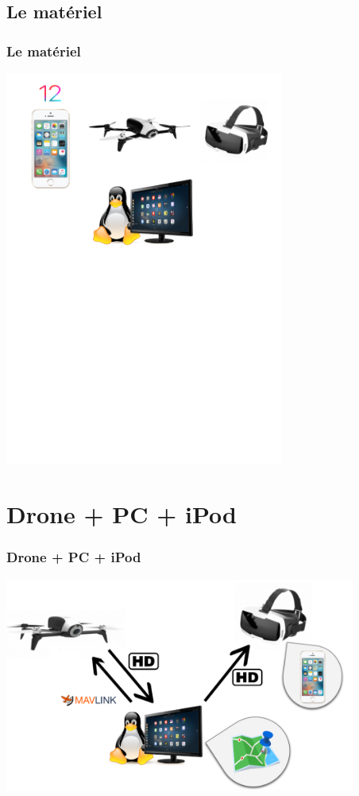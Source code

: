 \documentclass[11pt]{beamer}
\begin{document}
\subsection{Le matériel}
\begin{frame}
\frametitle{Le matériel}
\begin{center}
\includegraphics[height=13cm]{acteurs.png}
\end{center}
\end{frame}

\section{Drone + PC + iPod}
\begin{frame}
\frametitle{Drone + PC + iPod}
\includegraphics[height=7cm]{schemaPC.png}
\end{frame}
\end{document}
